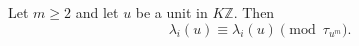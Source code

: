 Let $m \geq 2$ and let $u$ be a unit in $K\mathbb{Z}$. Then
$$
\lambda_i(u) \equiv \lambda_i(u) \pmod{\tau_{u^m}}.
$$
